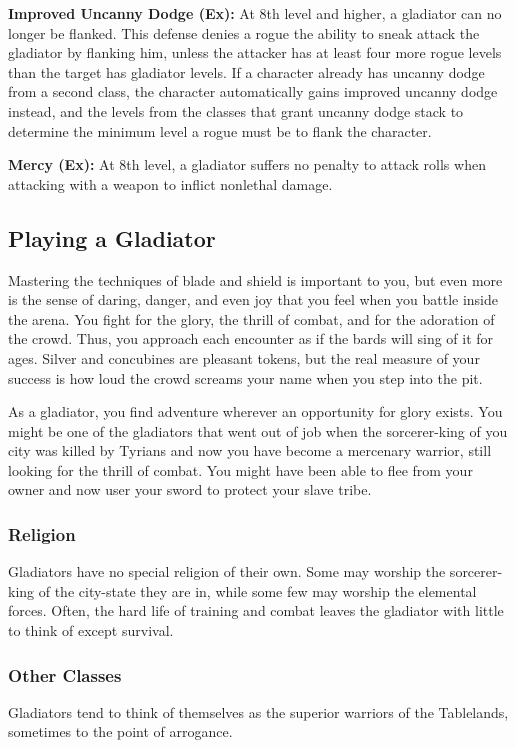 \textbf{Improved Uncanny Dodge (Ex):} At 8th level and higher, a gladiator can no longer be flanked. This defense denies a rogue the ability to sneak attack the gladiator by flanking him, unless the attacker has at least four more rogue levels than the target has gladiator levels. If a character already has uncanny dodge from a second class, the character automatically gains improved uncanny dodge instead, and the levels from the classes that grant uncanny dodge stack to determine the minimum level a rogue must be to flank the character.

\textbf{Mercy (Ex):} At 8th level, a gladiator suffers no penalty to attack rolls when attacking with a weapon to inflict nonlethal damage.

\subsection{Playing a Gladiator}
Mastering the techniques of blade and shield is important to you, but even more is the sense of daring, danger, and even joy that you feel when you battle inside the arena. You fight for the glory, the thrill of combat, and for the adoration of the crowd. Thus, you approach each encounter as if the bards will sing of it for ages. Silver and concubines are pleasant tokens, but the real measure of your success is how loud the crowd screams your name when you step into the pit.

As a gladiator, you find adventure wherever an opportunity for glory exists. You might be one of the gladiators that went out of job when the sorcerer-king of you city was killed by Tyrians and now you have become a mercenary warrior, still looking for the thrill of combat. You might have been able to flee from your owner and now user your sword to protect your slave tribe.

\subsubsection{Religion}
Gladiators have no special religion of their own. Some may worship the sorcerer-king of the city-state they are in, while some few may worship the elemental forces. Often, the hard life of training and combat leaves the gladiator with little to think of except survival.

\subsubsection{Other Classes}
Gladiators tend to think of themselves as the superior warriors of the Tablelands, sometimes to the point of arrogance.

